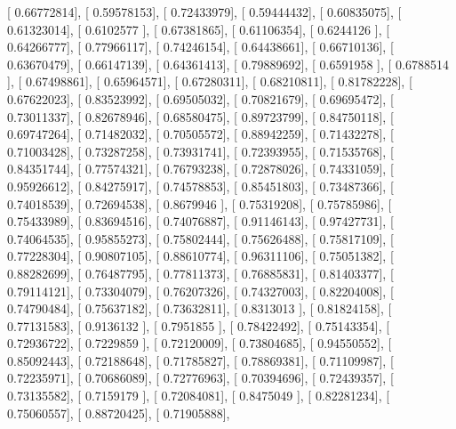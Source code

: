 \documentclass{article}
\begin{document}
       [ 0.66772814],
       [ 0.59578153],
       [ 0.72433979],
       [ 0.59444432],
       [ 0.60835075],
       [ 0.61323014],
       [ 0.6102577 ],
       [ 0.67381865],
       [ 0.61106354],
       [ 0.6244126 ],
       [ 0.64266777],
       [ 0.77966117],
       [ 0.74246154],
       [ 0.64438661],
       [ 0.66710136],
       [ 0.63670479],
       [ 0.66147139],
       [ 0.64361413],
       [ 0.79889692],
       [ 0.6591958 ],
       [ 0.6788514 ],
       [ 0.67498861],
       [ 0.65964571],
       [ 0.67280311],
       [ 0.68210811],
       [ 0.81782228],
       [ 0.67622023],
       [ 0.83523992],
       [ 0.69505032],
       [ 0.70821679],
       [ 0.69695472],
       [ 0.73011337],
       [ 0.82678946],
       [ 0.68580475],
       [ 0.89723799],
       [ 0.84750118],
       [ 0.69747264],
       [ 0.71482032],
       [ 0.70505572],
       [ 0.88942259],
       [ 0.71432278],
       [ 0.71003428],
       [ 0.73287258],
       [ 0.73931741],
       [ 0.72393955],
       [ 0.71535768],
       [ 0.84351744],
       [ 0.77574321],
       [ 0.76793238],
       [ 0.72878026],
       [ 0.74331059],
       [ 0.95926612],
       [ 0.84275917],
       [ 0.74578853],
       [ 0.85451803],
       [ 0.73487366],
       [ 0.74018539],
       [ 0.72694538],
       [ 0.8679946 ],
       [ 0.75319208],
       [ 0.75785986],
       [ 0.75433989],
       [ 0.83694516],
       [ 0.74076887],
       [ 0.91146143],
       [ 0.97427731],
       [ 0.74064535],
       [ 0.95855273],
       [ 0.75802444],
       [ 0.75626488],
       [ 0.75817109],
       [ 0.77228304],
       [ 0.90807105],
       [ 0.88610774],
       [ 0.96311106],
       [ 0.75051382],
       [ 0.88282699],
       [ 0.76487795],
       [ 0.77811373],
       [ 0.76885831],
       [ 0.81403377],
       [ 0.79114121],
       [ 0.73304079],
       [ 0.76207326],
       [ 0.74327003],
       [ 0.82204008],
       [ 0.74790484],
       [ 0.75637182],
       [ 0.73632811],
       [ 0.8313013 ],
       [ 0.81824158],
       [ 0.77131583],
       [ 0.9136132 ],
       [ 0.7951855 ],
       [ 0.78422492],
       [ 0.75143354],
       [ 0.72936722],
       [ 0.7229859 ],
       [ 0.72120009],
       [ 0.73804685],
       [ 0.94550552],
       [ 0.85092443],
       [ 0.72188648],
       [ 0.71785827],
       [ 0.78869381],
       [ 0.71109987],
       [ 0.72235971],
       [ 0.70686089],
       [ 0.72776963],
       [ 0.70394696],
       [ 0.72439357],
       [ 0.73135582],
       [ 0.7159179 ],
       [ 0.72084081],
       [ 0.8475049 ],
       [ 0.82281234],
       [ 0.75060557],
       [ 0.88720425],
       [ 0.71905888],
\end{document}
